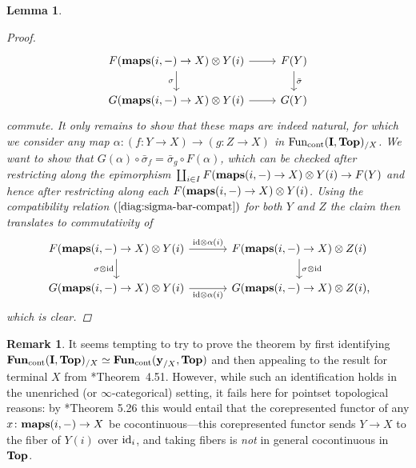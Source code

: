 \documentclass[reqno]{memo-l}
\theoremstyle{mythm}
\newtheorem{lemma}[thm]{Lemma}
\theoremstyle{definition}
\newtheorem{rk}[thm]{Remark}
\numberwithin{equation}{section}
\newcommand{\Fun}{{\textup{Fun}}}
\newcommand{\cat}[1]{\textbf{\textup{#1}}}
\newcommand{\maps}{\cat{maps}}
\newcommand{\id}{\textup{id}}
\newcommand{\cont}{\textup{cont}}
\begin{document}
\begin{lemma}
\begin{proof}
        \begin{equation}\label{diag:sigma-bar-compat}
            \begin{tikzcd}
                F(\maps(i,-)\to X)\otimes Y(i)\arrow[d,"\sigma"']\arrow[r]& F(Y)\arrow[d,"\bar\sigma"]\\
                G(\maps(i,-)\to X)\otimes Y(i)\arrow[r]& G(Y)
            \end{tikzcd}
        \end{equation}
        commute. It only remains to show that these maps are indeed natural, for which we consider any map $\alpha\colon (f\colon Y\to X)\to (g\colon Z\to X)$ in $\Fun_\cont(\cat{I},\cat{Top})_{/X}$. We want to show that $G(\alpha)\circ\bar\sigma_f=\bar\sigma_g\circ F(\alpha)$, which can be checked after restricting along the epimorphism $\coprod_{i\in I} F(\maps(i,-)\to X)\otimes Y(i)\to F(Y)$ and hence after restricting along each $F(\maps(i,-)\to X)\otimes Y(i)$. Using the compatibility relation $(\ref{diag:sigma-bar-compat})$ for both $Y$ and $Z$ the claim then translates to commutativity of
        \[
            \begin{tikzcd}
                F(\maps(i,-)\to X)\otimes Y(i)\arrow[d, "\sigma\otimes\id"']\arrow[r,"\id\otimes\alpha(i)"] &[1em] F(\maps(i,-)\to X)\otimes Z(i)\arrow[d,"\sigma\otimes\id"]\\
                G(\maps(i,-)\to X)\otimes Y(i)\arrow[r,"\id\otimes\alpha(i)"'] & G(\maps(i,-)\to X)\otimes Z(i)\rlap,
            \end{tikzcd}
        \]
        which is clear.        
    \end{proof}
\end{lemma}

\begin{rk}
    It seems tempting to try to prove the theorem by first identifying $\cat{Fun}_\cont(\cat{I},\cat{Top})_{/X}\simeq\cat{Fun}_\cont(\cat{y}_{/X},\cat{Top})$ and then appealing to the result for terminal $X$ from \cite{kelly-enriched}*{Theorem~4.51}. However, while such an identification holds in the unenriched (or $\infty$-categorical) setting, it fails here for pointset topological reasons: by \cite{kelly-enriched}*{Theorem 5.26} this would entail that the corepresented functor of any $x\colon\maps(i,-)\to X$ be cocontinuous---this corepresented functor sends $Y\to X$ to the fiber of $Y(i)$ over $\id_i$, and taking fibers is \emph{not} in general cocontinuous in $\cat{Top}$. 
\end{rk}
\end{document}
